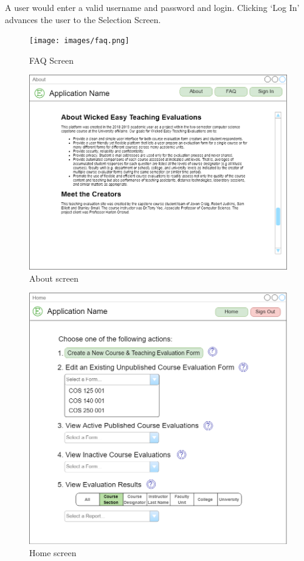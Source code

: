 \documentclass{article}
\begin{document}
A user would enter a valid username and password and login. Clicking `Log In' advances the user to the Selection Screen.

\begin{center}
\begin{figure}[H]
    \centering
    \caption{FAQ Screen}
    \texttt{[image: images/faq.png]}
\end{figure}
\end{center}

\begin{center}
\begin{figure}[H]
    \centering
    \caption{About screen}
    \includegraphics[scale=.35]{images/about_screen.png}
\end{figure}
\end{center}

\begin{center}
\begin{figure}[H]
    \centering
    \caption{Home screen}
    \includegraphics[scale=.35]{images/home_screen.png}
\end{figure}
\end{center}
\end{document}
